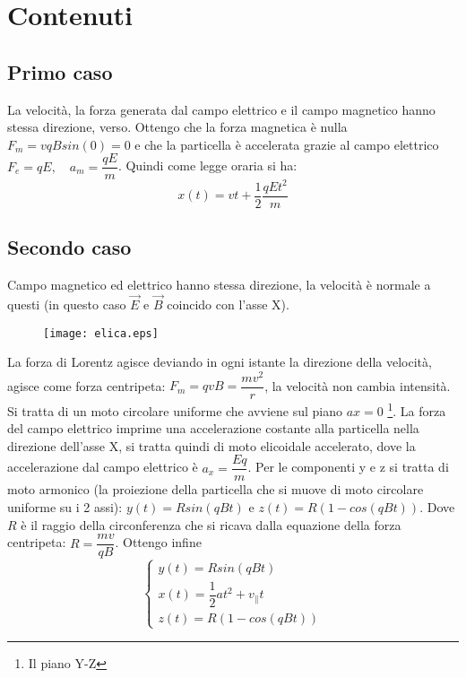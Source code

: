 \documentclass[dvips]{article}
\begin{document}
\section{Contenuti}
\subsection{Primo caso}
La velocità, la forza generata dal campo elettrico e il campo magnetico hanno stessa direzione, verso. \newline
Ottengo che la forza magnetica è nulla $F_m = vqBsin(0) = 0$ e che la particella è accelerata grazie al campo elettrico $F_e = qE,  \quad a_m = \dfrac{qE}{m}$. Quindi come legge oraria si ha: 
\begin{equation}
    x(t) = vt + \dfrac{1}{2}\dfrac{qEt^2}{m}
\end{equation}

\subsection{Secondo caso}
Campo magnetico ed elettrico hanno stessa direzione, la velocità è normale a questi (in questo caso $\Vec{E}$ e $\Vec{B}$ coincido con l'asse X).
\begin{figure}[H]
    \centering
    \texttt{[image: elica.eps]}
\end{figure}
La forza di Lorentz agisce deviando in ogni istante la direzione della velocità, agisce come forza centripeta: $F_m = qvB = \dfrac{mv^2}{r}$, la velocità non cambia intensità. Si tratta di un moto circolare uniforme che avviene sul piano $ax=0$ \footnote{Il piano Y-Z}.
La forza del campo elettrico imprime una accelerazione costante alla particella nella direzione dell'asse X, si tratta quindi di moto elicoidale accelerato, dove la accelerazione dal campo elettrico è $a_x = \dfrac{Eq}{m}$.  Per le componenti y e z si tratta di moto armonico (la proiezione della particella che si muove di moto circolare uniforme su i 2 assi): $y(t)=Rsin(qBt)$ e $z(t) = R(1- cos(qBt))$. Dove $R$ è il raggio della circonferenza che si ricava dalla equazione della forza centripeta: $R = \dfrac{mv}{qB}$. Ottengo infine
\begin{equation}
    \begin{cases}
      y(t) = Rsin(qBt)\\ 
      x(t)= \dfrac{1}{2}at^2+v_{\parallel}t\\
      z(t) = R (1 - cos(qBt))
    \end{cases}
\end{equation}
\end{document}
